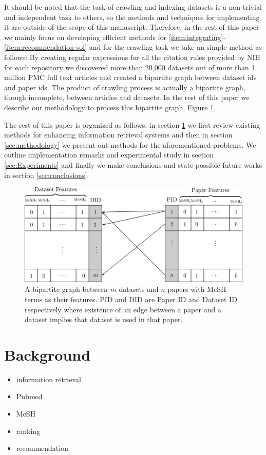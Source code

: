 \documentclass{amia}
\begin{document}
It should be noted that the task of crawling and indexing datasets is a non-trivial and independent task to others, so the methods and techniques for implementing it are outside of the scope of this manuscript. Therefore, in the rest of this paper we mainly focus on developing efficient methods for \eqref{item:integrating}-\eqref{item:recommendation-sol} and for the crawling task we take an simple method as follows: 
By creating regular expressions for all the citation rules provided by NIH for each repository we discovered more than 20,000 datasets out of more than 1 million PMC full text articles and created a bipartite graph between dataset ids and paper ids. The  product of crawling process is actually a bipartite graph, though incomplete, between articles and datasets. In the rest of this paper we describe our methodology to process this bipartite graph, Figure \ref{fig:bipartite}.

The rest of this paper is organized as follows: in section \ref{sec:background} we first review existing methods for enhancing information retrieval systems and then in section \ref{sec:methodology} we present out methods for the aforementioned problems. We outline implementation remarks and experimental study in section \ref{sec:Experiments} and finally we make conclusions and state possible future works in section \ref{sec:conclusions}.

\begin{figure}\label{fig:bipartite}
\centering
\includegraphics[scale=0.7]{bipartite.png}
\caption{A bipartite graph between $m$ datasets and $n$ papers with MeSH terms as their features. PID and DID are Paper ID and Dataset ID respectively where existence of an edge between a paper and a dataset implies that dataset is used in that paper.}
\end{figure}

\section{Background} \label{sec:background}
\begin{itemize}
\item information retrieval
\item Pubmed
\item MeSH
\item ranking

\item recommendation

\end{itemize}
\end{document}
